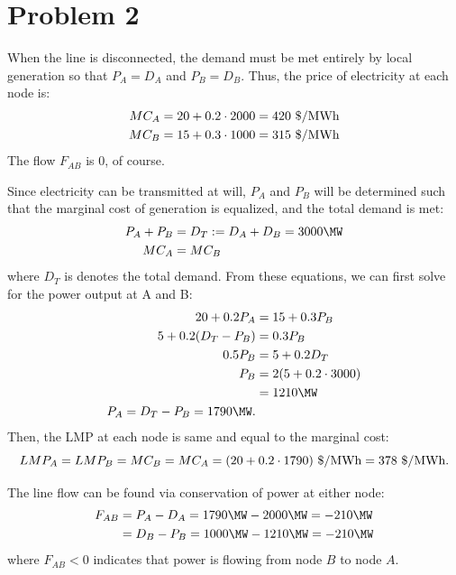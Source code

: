 \documentclass{homework}
\begin{document}
\section{Problem 2}

\begin{letterenum}
\item When the line is disconnected, the demand must be met entirely by local generation
    so that $P_A = D_A$ and $P_B = D_B$. Thus, the price of electricity at each
    node is:
    \begin{align*}
        MC_A = 20 + 0.2 \cdot 2000 = 420 \text{ \$/MWh} \\
        MC_B = 15 + 0.3 \cdot 1000 = 315 \text{ \$/MWh} \\
    \end{align*}
    The flow $F_{AB}$ is 0, of course.

\item Since electricity can be transmitted at will, $P_A$ and $P_B$ will be 
    determined such that the marginal cost of generation is equalized,
    and the total demand is met:
    \begin{align*}
        P_A + P_B &= D_T := D_A + D_B = 3000 \MW \\
        MC_A &= MC_B
    \end{align*}
    where $D_T$ is denotes the total demand. From these equations,
    we can first solve for the power output at A and B:
    \begin{align*}
        20 + 0.2 P_A &= 15 + 0.3 P_B \\
        5 + 0.2 (D_T - P_B) &= 0.3 P_B \\
        0.5 P_B &= 5 + 0.2 D_T \\
        P_B &= 2(5 + 0.2 \cdot 3000) \\
            &= 1210 \MW \\
        P_A = D_T - P_B = 1790 \MW.
    \end{align*}
    Then, the LMP at each node is same and equal to the marginal cost:
    \begin{equation*}
        LMP_A = LMP_B = MC_B = MC_A = (20 + 0.2 \cdot 1790) \text{ \$/MWh} = 378 \text{ \$/MWh} .
    \end{equation*}

    The line flow can be found via conservation of power at either node:
    \begin{align*}
        F_{AB} &= P_A - D_A = 1790 \MW - 2000 \MW = -210 \MW \\
               &= D_B - P_B = 1000 \MW - 1210 \MW = -210 \MW
    \end{align*}
    where $F_{AB} < 0$ indicates that power is flowing from node $B$ to node $A$.


\end{letterenum}
\end{document}
